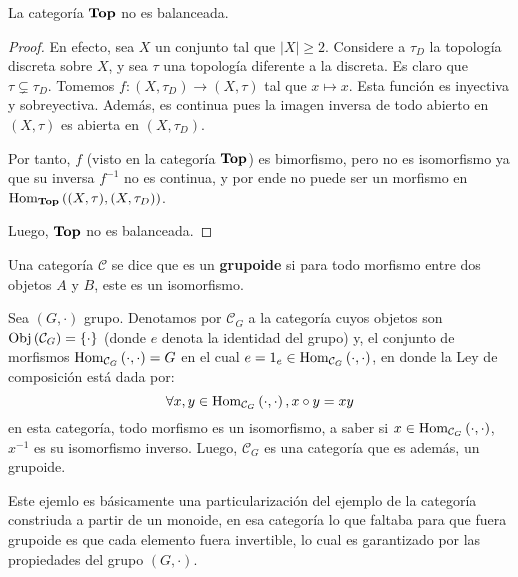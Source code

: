 \documentclass[12pt]{report}
\theoremstyle{largebreak}
\newcommand\abs[1]{\ensuremath{\big|#1\big|}}
\newcommand\cf[3]{\ensuremath{#1:#2\rightarrow#3}}
\newcommand{\Obj}[1]{\ensuremath{\textup{Obj}\left(#1\right)}}
\newcommand{\Hom}[3]{\ensuremath{\textup{Hom}_{#1}\left(#2,#3\right)}}
\newcommand{\Cat}[1]{\ensuremath{\textup{\textbf{#1}}}}
\begin{document}
    \begin{exa}
        La categoría $\Cat{Top}$ no es balanceada.
    \end{exa}

    \begin{proof}
        En efecto, sea $X$ un conjunto tal que $\abs{X}\geq 2$. Considere a $\tau_D$ la topología discreta sobre $X$, y sea $\tau$ una topología diferente a la discreta. Es claro que $\tau\subsetneq\tau_D$. Tomemos $\cf{f}{(X,\tau_D)}{(X,\tau)}$ tal que $x\mapsto x$. Esta función es inyectiva y sobreyectiva. Además, es continua pues la imagen inversa de todo abierto en $(X,\tau)$ es abierta en $(X,\tau_D)$.

        Por tanto, $f$ (visto en la categoría $\Cat{Top}$) es bimorfismo, pero no es isomorfismo ya que su inversa $f^{-1}$ no es continua, y por ende no puede ser un morfismo en $\Hom{\Cat{Top}}{(X,\tau)}{(X,\tau_D)}$.

        Luego, $\Cat{Top}$ no es balanceada.
    \end{proof}

    \begin{mydef}
        Una categoría $\mathcal{C}$ se dice que es un \textbf{grupoide} si para todo morfismo entre dos objetos $A$ y $B$, este es un isomorfismo.
    \end{mydef}

    \begin{exa}
        Sea $(G,\cdot)$ grupo. Denotamos por $\mathcal{C}_G$ a la categoría cuyos objetos son $\Obj{\mathcal{C}_G}=\left\{\cdot \right\}$ (donde $e$ denota la identidad del grupo) y, el conjunto de morfismos $\Hom{\mathcal{C}_G}{\cdot}{\cdot}=G$ en el cual $e=1_e\in\Hom{\mathcal{C}_G}{\cdot}{\cdot}$, en donde la Ley de composición está dada por:
        \begin{equation*}
            \forall x,y\in\Hom{\mathcal{C}_G}{\cdot}{\cdot}, x\circ y =xy
        \end{equation*}
        en esta categoría, todo morfismo es un isomorfismo, a saber si $x\in\Hom{\mathcal{C}_G}{\cdot}{\cdot}$, $x^{-1}$ es su isomorfismo inverso. Luego, $\mathcal{C}_G$ es una categoría que es además, un grupoide.

        Este ejemlo es básicamente una particularización del ejemplo de la categoría constriuda a partir de un monoide, en esa categoría lo que faltaba para que fuera grupoide es que cada elemento fuera invertible, lo cual es garantizado por las propiedades del grupo $(G,\cdot)$.
    \end{exa}
\end{document}
